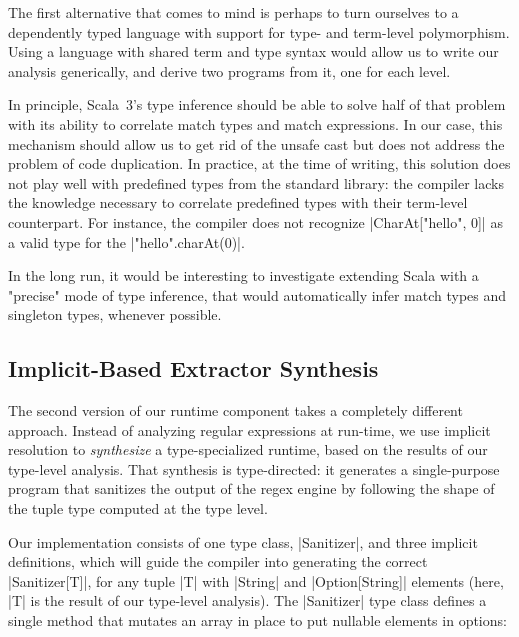 The first alternative that comes to mind is perhaps to turn ourselves to a dependently typed language with support for type- and term-level polymorphism.
Using a language with shared term and type syntax would allow us to write our analysis generically, and derive two programs from it, one for each level.

In principle, Scala~3's type inference should be able to solve half of that problem with its ability to correlate match types and match expressions.%
%
In our case, this mechanism should allow us to get rid of the unsafe cast but does not address the problem of code duplication.
In practice, at the time of writing, this solution does not play well with predefined types from the standard library: the compiler lacks the knowledge necessary to correlate predefined types with their term-level counterpart.
For instance, the compiler does not recognize |CharAt["hello", 0]| as a valid type for the |"hello".charAt(0)|.

In the long run, it would be interesting to investigate extending Scala with a "precise" mode of type inference, that would automatically infer match types and singleton types, whenever possible.

\subsection{Implicit-Based Extractor Synthesis}
\label{subsec:implicit-based-extractor-synthesis}

The second version of our runtime component takes a completely different approach.
Instead of analyzing regular expressions at run-time, we use implicit resolution to \emph{synthesize} a type-specialized runtime, based on the results of our type-level analysis.
That synthesis is type-directed: it generates a single-purpose program that sanitizes the output of the regex engine by following the shape of the tuple type computed at the type level.

Our implementation consists of one type class, |Sanitizer|, and three implicit definitions, which will guide the compiler into generating the correct |Sanitizer[T]|, for any tuple |T| with |String| and |Option[String]| elements (here, |T| is the result of our type-level analysis).
The |Sanitizer| type class defines a single method that mutates an array in place to put nullable elements in options:

